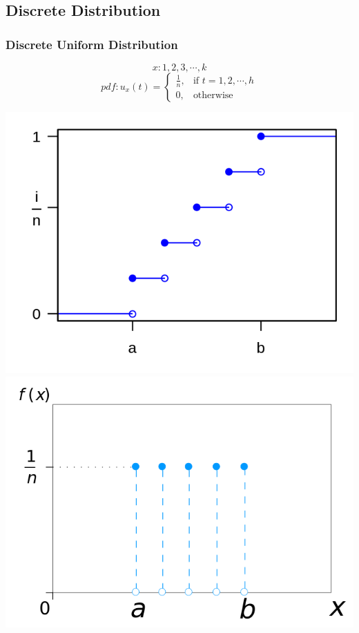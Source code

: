 \documentclass{article}
\begin{document}
    \subsection{Discrete Distribution}{
        \subsubsection{Discrete Uniform Distribution}{
            \[ x: 1,2,3, \cdots, k\]
            \[ pdf: u_x(t)= \begin{cases} 
                \frac{1}{n}, & \text{if } t=1, 2,  \cdots, h \\
                0, & \text{otherwise} 
            \end{cases}\]
            \begin{center}{
                \includegraphics[scale=0.25]{Dis_Uniform_distribution_CDF.png}\includegraphics[scale=0.25]{Dis_Uniform_distribution_pmf.png}
            }
            \end{center}
        }
}
\end{document}

